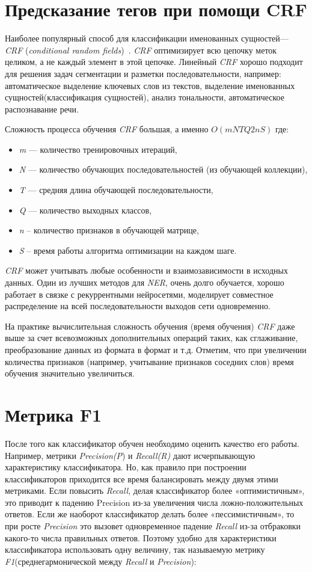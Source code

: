 \documentclass{csmathnotes}
\begin{document}
\section*{Предсказание тегов при помощи CRF}
Наиболее  популярный способ для классификации именованных сущностей— \emph{CRF} (\emph{conditional random fields})~\cite{HabrCRF}. \emph{CRF} оптимизирует всю цепочку меток целиком, а не каждый элемент в этой цепочке.  Линейный \emph{CRF} хорошо подходит для решения задач сегментации и разметки последовательности, например: автоматическое выделение ключевых слов из текстов, выделение именованных сущностей(классификация сущностей), анализ тональности, автоматическое распознавание речи.


Сложность процесса обучения \emph{CRF} большая, а именно $O(mNTQ2nS)$ где:
\begin{itemize}
    \item \emph{m} — количество тренировочных итераций,
    \item \emph{N} — количество обучающих последовательностей (из обучающей коллекции),
    \item \emph{T} — средняя длина обучающей последовательности,
    \item \emph{Q} — количество выходных классов,
    \item \emph{n} – количество признаков в обучающей матрице,
    \item \emph{S} – время работы алгоритма оптимизации на каждом шаге. 
\end{itemize}


\emph{CRF} может учитывать любые особенности и взаимозависимости в исходных данных. Один из лучших методов для \emph{NER}, очень долго обучается, хорошо работает в связке с рекуррентными нейросетями, моделирует совместное распределение на всей последовательности выходов сети одновременно.

На практике вычислительная сложность обучения (время обучения) \emph{CRF} даже выше за счет всевозможных дополнительных операций таких, как сглаживание, преобразование данных из формата в формат и т.д. Отметим, что при увеличении количества признаков (например, учитывание признаков соседних слов) время обучения значительно увеличиться. 

\section*{Метрика F1}
После того как классификатор обучен необходимо оценить качество его работы. Например, метрики \emph{Precision(P}) и \emph{Recall(R)} дают исчерпывающую характеристику классификатора. Но, как правило при построении классификаторов приходится все время балансировать между двумя этими метриками. Если повысить \emph{Recall}, делая классификатор более «оптимистичным», это приводит к падению Precision из-за увеличения числа ложно-положительных ответов. Если же наоборот классификатор делать более «пессимистичным», то при росте \emph{Precision} это вызовет одновременное падение \emph{Recall} из-за отбраковки какого-то числа правильных ответов. Поэтому удобно для характеристики классификатора использовать одну величину, так называемую метрику \emph{F1}(среднегармонической между \emph{Recall} и \emph{Precision}):
\end{document}
